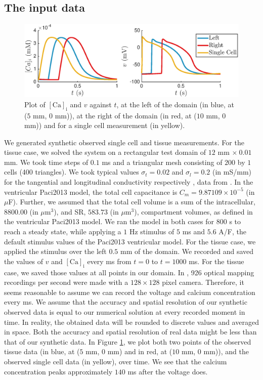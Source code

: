 \documentclass{article}
\begin{document}
\subsection{The input data} \label{The input data}
%
\begin{figure}
   \includegraphics[width=1\linewidth]{strip} 
    \caption{Plot of $[\mathrm{Ca}]_{\mathrm{i}}$ and $v$ against $t$, at the left of the domain (in blue, at ($5$ mm, $0$ mm)), at the right of the domain (in red, at ($10$ mm, $0$ mm)) and for a single cell measurement (in yellow).}
    \label{fig:3}
\end{figure}
%
We generated synthetic observed single cell and tissue measurements. For the tissue case, we solved the system on a rectangular test domain of $12$ mm $\times\: 0.01$ mm. We took time steps of $0.1$ ms and a triangular mesh consisting of $200$ by $1$ cells (400 triangles). We took typical values $\sigma_t=0.02$ and $\sigma_l=0.2$ (in mS/mm) for the tangential and longitudinal conductivity respectively \cite{Roth}, data from \cite{Plonsey1982, Plonsey1984}. In the ventricular Paci2013 model, the total cell capacitance is $C_m=9.87109\times 10^{-5}$ (in $\mu$F). Further, we assumed that the total cell volume is a sum of the intracellular, $8800.00$ (in $\mu$m$^3$), and SR, $583.73$ (in $\mu$m$^3$), compartment volumes, as defined in the ventricular Paci2013 model.
We ran the model in both cases for 800 s to reach a steady state, while applying a $1$ Hz stimulus of $5$ ms and $5.6$ A/F, the default stimulus values of the Paci2013 ventricular model. For the tissue case, we applied the stimulus over the left $0.5$ mm of the domain. We recorded and saved the values of $v$ and $[\mathrm{Ca}]_{\mathrm{i}}$ every ms from $t=0$ to $t=1000$ ms. For the tissue case, we saved those values at all points in our domain. In \cite{Lee2012}, 926 optical mapping recordings per second were made with a $128 \times 128$ pixel camera. Therefore, it seems reasonable to assume we can record the voltage and calcium concentration every ms. We assume that the accuracy and spatial resolution of our synthetic observed data is equal to our numerical solution at every recorded moment in time. In reality, the obtained data will be rounded to discrete values and averaged in space. Both the accuracy and spatial resolution of real data might be less than that of our synthetic data. In Figure \ref{fig:3}, we plot both two points of the observed tissue data (in blue, at ($5$ mm, $0$ mm) and in red, at ($10$ mm, $0$ mm)), and the observed single cell data (in yellow), over time. We see that the calcium concentration peaks approximately $140$ ms after the voltage does. 
\end{document}
